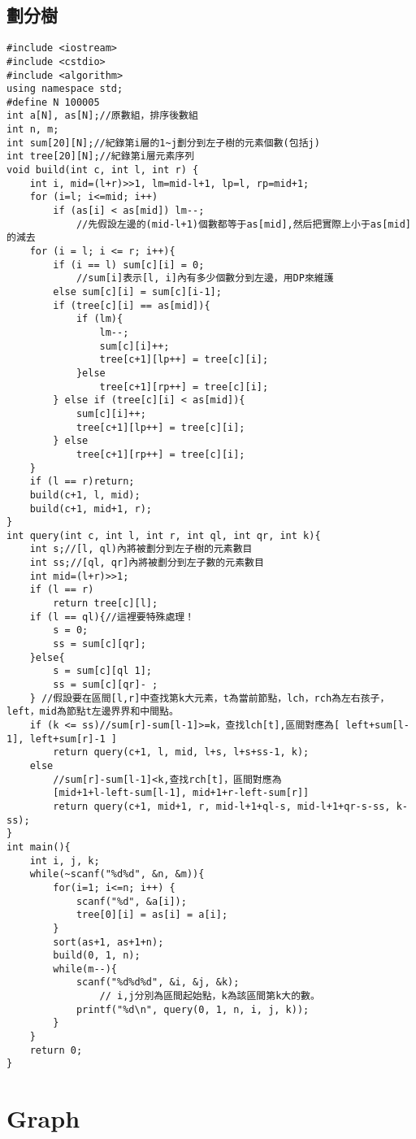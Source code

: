 \documentclass[11pt,twocolumn,a4paper]{article}
\begin{document}
\subsection{劃分樹}
\begin{lstlisting}[label=劃分樹]
#include <iostream>
#include <cstdio>
#include <algorithm>
using namespace std;
#define N 100005
int a[N], as[N];//原數組，排序後數組 
int n, m;
int sum[20][N];//紀錄第i層的1~j劃分到左子樹的元素個數(包括j)
int tree[20][N];//紀錄第i層元素序列
void build(int c, int l, int r) {
	int i, mid=(l+r)>>1, lm=mid-l+1, lp=l, rp=mid+1;
	for (i=l; i<=mid; i++)
		if (as[i] < as[mid]) lm--;
			//先假設左邊的(mid-l+1)個數都等于as[mid],然后把實際上小于as[mid]的減去
	for (i = l; i <= r; i++){
		if (i == l) sum[c][i] = 0;
			//sum[i]表示[l, i]內有多少個數分到左邊，用DP來維護 
		else sum[c][i] = sum[c][i-1];
		if (tree[c][i] == as[mid]){
			if (lm){
				lm--;
				sum[c][i]++;
				tree[c+1][lp++] = tree[c][i];
			}else
				tree[c+1][rp++] = tree[c][i];
		} else if (tree[c][i] < as[mid]){
			sum[c][i]++;
			tree[c+1][lp++] = tree[c][i];
		} else
			tree[c+1][rp++] = tree[c][i];
	}
	if (l == r)return;
	build(c+1, l, mid);
	build(c+1, mid+1, r);
}
int query(int c, int l, int r, int ql, int qr, int k){
	int s;//[l, ql)內將被劃分到左子樹的元素數目
	int ss;//[ql, qr]內將被劃分到左子數的元素數目
	int mid=(l+r)>>1;
	if (l == r)
		return tree[c][l];
	if (l == ql){//這裡要特殊處理！
		s = 0;
		ss = sum[c][qr];
	}else{
		s = sum[c][ql 1];
		ss = sum[c][qr]- ;
	} //假設要在區間[l,r]中查找第k大元素，t為當前節點，lch，rch為左右孩子，left，mid為節點t左邊界界和中間點。
	if (k <= ss)//sum[r]-sum[l-1]>=k，查找lch[t],區間對應為[ left+sum[l-1], left+sum[r]-1 ]
		return query(c+1, l, mid, l+s, l+s+ss-1, k);
	else
		//sum[r]-sum[l-1]<k,查找rch[t]，區間對應為
		[mid+1+l-left-sum[l-1], mid+1+r-left-sum[r]]
		return query(c+1, mid+1, r, mid-l+1+ql-s, mid-l+1+qr-s-ss, k-ss);
}
int main(){
	int i, j, k;
	while(~scanf("%d%d", &n, &m)){
		for(i=1; i<=n; i++) {
			scanf("%d", &a[i]);
			tree[0][i] = as[i] = a[i];
		}
		sort(as+1, as+1+n);
		build(0, 1, n);
		while(m--){
			scanf("%d%d%d", &i, &j, &k);
				// i,j分別為區間起始點，k為該區間第k大的數。
			printf("%d\n", query(0, 1, n, i, j, k));
		}
	}
	return 0;
}
\end{lstlisting}


\newpage
\section{Graph}
\end{document}
